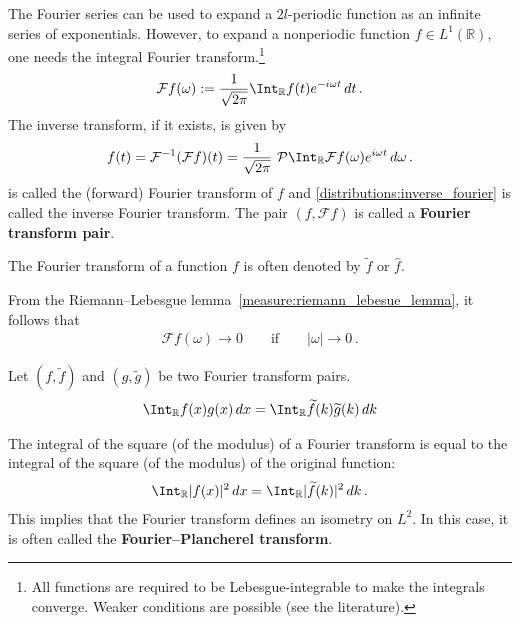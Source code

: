     The Fourier series can be used to expand a $2l$-periodic function as an infinite series of exponentials. However, to expand a nonperiodic function $f\in L^1(\mathbb{R})$, one needs the integral Fourier transform.\footnote{All functions are required to be Lebesgue-integrable to make the integrals converge. Weaker conditions are possible (see the literature).}
    \begin{gather}
        \label{distributions:fourier}
        \mathcal{F}f(\omega) := \frac{1}{\sqrt{2\pi}}\Int_{\mathbb{R}}f(t)e^{-i\omega t}\,dt\,.
    \end{gather}
    The inverse transform, if it exists, is given by
    \begin{gather}
        \label{distributions:inverse_fourier}
        f(t) = \mathcal{F}^{-1}(\mathcal{F}f)(t) = \frac{1}{\sqrt{2\pi}}\  \mathcal{P}\Int_{\mathbb{R}}\mathcal{F}f(\omega)e^{i\omega t}\,d\omega\,.
    \end{gather}
     is called the (forward) Fourier transform of $f$ and \cref{distributions:inverse_fourier} is called the inverse Fourier transform. The pair $(f,\mathcal{F}f)$ is called a \textbf{Fourier transform pair}.
    \begin{notation}
        The Fourier transform of a function $f$ is often denoted by $\widetilde{f}$ or $\widehat{f}$.
    \end{notation}

    \begin{property}
        From the Riemann--Lebesgue lemma~\ref{measure:riemann_lebesue_lemma}, it follows that
        \begin{gather}
            \mathcal{F}f(\omega)\longrightarrow0\qquad\text{if}\qquad |\omega|\longrightarrow0\,.
        \end{gather}
    \end{property}

    \begin{theorem}[Parceval]\label{distributions:parcevals_theorem}
        Let $(f,\widetilde{f})$ and $(g,\widetilde{g})$ be two Fourier transform pairs.
        \begin{gather}
            \Int_{\mathbb{R}} f(x)g(x)\,dx = \Int_{\mathbb{R}}\widetilde{f}(k)\widetilde{g}(k)\,dk
        \end{gather}
    \end{theorem}
    \begin{result}[Plancherel]\label{distributions:plancherel_theorem}
        The integral of the square (of the modulus) of a Fourier transform is equal to the integral of the square (of the modulus) of the original function:
        \begin{gather}
            \Int_{\mathbb{R}}|f(x)|^2\,dx = \Int_{\mathbb{R}}|\widetilde{f}(k)|^2\,dk\,.
        \end{gather}
        This implies that the Fourier transform defines an isometry on $L^2$. In this case, it is often called the \textbf{Fourier--Plancherel transform}.
    \end{result}

